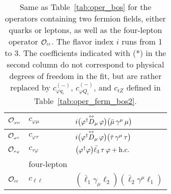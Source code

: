 \begin{table}[htbp]
\begin{center}
\begin{tabular}{lll}
    $\mathcal{O}_{\scriptscriptstyle \varphi \mu}$ & $c_{\varphi \mu}$ & $ i\big(\varphi^\dagger\overset{\text{\scriptsize$\leftrightarrow$}}{D}_\mu\,\varphi\big)
 \big(\bar{\mu}\,\gamma^\mu\,\mu\big)$ \\  \hline
    $\mathcal{O}_{\scriptscriptstyle \varphi \tau}$ & $c_{\varphi \tau}$ & $i\big(\varphi^\dagger\overset{\text{\scriptsize$\leftrightarrow$}}{D}_\mu\,\varphi\big)
 \big(\bar{\tau}\,\gamma^\mu\,\tau\big)$ \\  \hline
    $\mathcal{O}_{\scriptscriptstyle \tau \varphi}$ & $c_{\tau \varphi}$ & $\left(\pdp\right)
 \bar{\ell_3}\,\tau\,{\varphi} + \text{h.c.}$ \\
                \midrule \midrule
		&four-lepton &\\
                \midrule \midrule
 $\mathcal{O}_{\scriptscriptstyle \ell\ell}$ & $c_{\ell\ell}$ & $\left(\bar \ell_1\gamma_\mu \ell_2\right) \left(\bar \ell_2\gamma^\mu \ell_1\right)$ \\
 \hline
  \bottomrule
\end{tabular}
\caption{Same as Table~\ref{tab:oper_bos}
  for the operators containing two fermion fields, either
  quarks or leptons, as well as the four-lepton operator $\mathcal{O}_{\scriptscriptstyle \ell\ell}$.
  The flavor index $i$ runs from 1 to 3.
  The coefficients indicated with (*) in the second column do not correspond to physical degrees of freedom
  in the fit, but are rather replaced by  $c_{\varphi q_i}^{(-)}$, $c_{\varphi Q_i}^{(-)}$, and
  $c_{tZ}$ defined in Table~\ref{tab:oper_ferm_bos2}.
\label{tab:oper_ferm_bos}}
\end{center}
\end{table}
